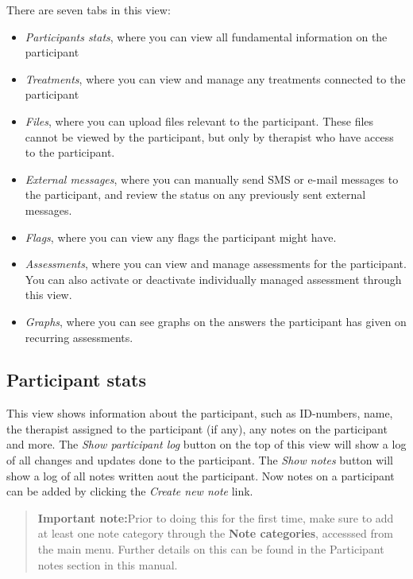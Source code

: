 \documentclass[]{book}
\providecommand{\tightlist}{%
  \setlength{\itemsep}{0pt}\setlength{\parskip}{0pt}}
\begin{document}
There are seven tabs in this view:

\begin{itemize}
\tightlist
\item
  \emph{Participants stats}, where you can view all fundamental information on the participant
\item
  \emph{Treatments}, where you can view and manage any treatments connected to the participant
\item
  \emph{Files}, where you can upload files relevant to the participant. These files cannot be viewed by the participant, but only by therapist who have access to the participant.
\item
  \emph{External messages}, where you can manually send SMS or e-mail messages to the participant, and review the status on any previously sent external messages.
\item
  \emph{Flags}, where you can view any flags the participant might have.
\item
  \emph{Assessments}, where you can view and manage assessments for the participant. You can also activate or deactivate individually managed assessment through this view.
\item
  \emph{Graphs}, where you can see graphs on the answers the participant has given on recurring assessments.
\end{itemize}

\hypertarget{participant-stats}{%
\subsection{Participant stats}\label{participant-stats}}

This view shows information about the participant, such as ID-numbers, name, the therapist assigned to the participant (if any), any notes on the participant and more.
The \emph{Show participant log} button on the top of this view will show a log of all changes and updates done to the participant. The \emph{Show notes} button will show a log of all notes written aout the participant.
Now notes on a participant can be added by clicking the \emph{Create new note} link.

\begin{quote}
\textbf{Important note:}Prior to doing this for the first time, make sure to add at least one note category through the \textbf{Note categories}, accesssed from the main menu. Further details on this can be found in the Participant notes section in this manual.
\end{quote}
\end{document}
